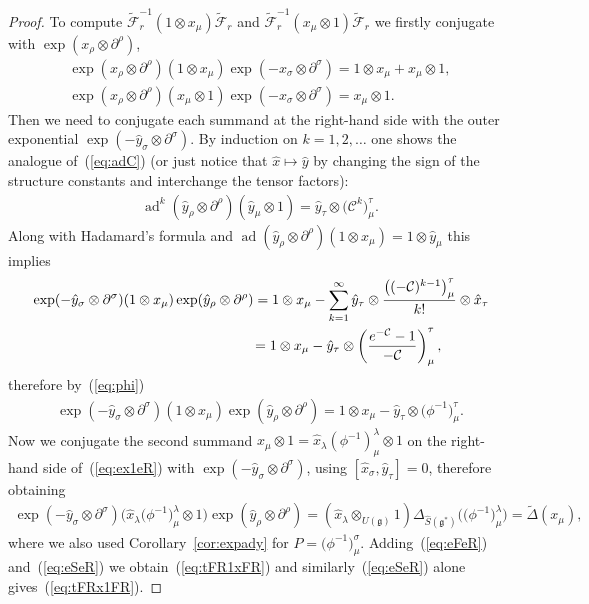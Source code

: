 \documentclass[10pt,a4paper]{amsart}
\def\gg{\mathfrak{g}}
\def\CC{\mathcal{C}}
\def\hx{\hat{x}}
\def\hy{\hat{y}}
\def\ad{\operatorname{ad}}
\numberwithin{equation}{section}
\begin{document}
\begin{proof}
To compute $\tilde{\mathcal{F}}^{-1}_r(1\otimes x_\mu)\tilde{\mathcal{F}}_r$ and $\tilde{\mathcal{F}}^{-1}_r(x_\mu\otimes 1)\tilde{\mathcal{F}}_r$ we firstly conjugate with $\exp(x_\rho\otimes\partial^\rho)$,
\begin{gather}
\exp(x_\rho\otimes\partial^\rho)(1\otimes x_\mu) \exp(-x_\sigma\otimes\partial^\sigma) = 1\otimes x_\mu + x_\mu \otimes 1,\nonumber\\
\exp(x_\rho\otimes\partial^\rho)(x_\mu\otimes 1)\exp(-x_\sigma\otimes\partial^\sigma) = x_\mu \otimes 1.\label{eq:ex1eR}
\end{gather}
Then we need to conjugate each summand at the right-hand side with the outer exponential $\exp(-\hy_\sigma\otimes\partial^\sigma)$. By induction on $k = 1,2,\ldots$ one shows the analogue of~(\ref{eq:adC}) (or just notice that $\hx\mapsto \hy$ by changing the sign of the structure constants and interchange the tensor factors):
\begin{gather*}%
\ad^k(\hy_\rho\otimes\partial^\rho) (\hy_\mu\otimes 1) = \hy_\tau\otimes\big(\CC^k\big)^\tau_\mu.
\end{gather*}
Along with Hadamard's formula and
$\ad(\hy_\rho\otimes\partial^\rho)(1\otimes x_\mu)=1\otimes\hy_\mu$
this implies
\begin{gather*}
\begin{split}
&\exp(-\hy_\sigma\otimes\partial^\sigma)(1\otimes x_\mu)\exp(\hy_\rho\otimes\partial^\rho) = 1\otimes x_\mu - \sum_{k=1}^\infty \hy_\tau\otimes\frac{\big((-\CC)^{k-1}\big)^\tau_\mu}{k!}\otimes\hx_\tau \\
& \hphantom{\exp(-\hy_\sigma\otimes\partial^\sigma)(1\otimes x_\mu)\exp(\hy_\rho\otimes\partial^\rho)}{}
= 1\otimes x_\mu -\hy_\tau\otimes\left(\frac{e^{-\CC}-1}{-\CC}\right)^\tau_\mu,
\end{split}
\end{gather*}
therefore by~(\ref{eq:phi})
\begin{gather}\label{eq:eFeR}
\exp(-\hy_\sigma\otimes\partial^\sigma)(1\otimes x_\mu)\exp(\hy_\rho\otimes\partial^\rho) = 1\otimes x_\mu - \hat{y}_\tau\otimes\big(\phi^{-1}\big)^\tau_\mu.
\end{gather}
Now we conjugate
the second summand $x_\mu\otimes 1 = \hx_\lambda(\phi^{-1})^\lambda_\mu\otimes 1$ on the right-hand side of~(\ref{eq:ex1eR}) with $\exp(-\hy_\sigma\otimes\partial^\sigma)$, using $[\hx_\sigma,\hy_\tau] = 0$, therefore obtaining
\begin{gather}\label{eq:eSeR}
\exp(-\hy_\sigma\otimes\partial^\sigma)\big(\hx_\lambda\big(\phi^{-1}\big)^\lambda_\mu\otimes 1\big)\exp(\hy_\rho\otimes\partial^\rho) = (\hx_\lambda\otimes_{U(\gg)}1)\Delta_{\hat{S}(\gg^*)}\big(\big(\phi^{-1}\big)^\lambda_\mu\big) = \tilde\Delta(x_\mu),\!\!\!
\end{gather}
where we also used Corollary~\ref{cor:expady} for $P = \big(\phi^{-1}\big)^\sigma_\mu$. Adding~(\ref{eq:eFeR}) and~(\ref{eq:eSeR}) we obtain~(\ref{eq:tFR1xFR}) and similarly~(\ref{eq:eSeR}) alone gives~(\ref{eq:tFRx1FR}).


\end{proof}
\end{document}
